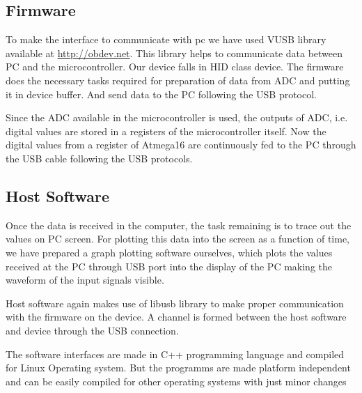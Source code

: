 \documentclass[12pt,a4paper]{article}
\begin{document}
\subsection{Firmware}
To make the interface to communicate with pc we have used VUSB library available at \url{http://obdev.net}. This library helps to communicate data between PC and the microcontroller. Our device falls in HID class device. The firmware does the necessary tasks required for preparation of data from ADC and putting it in device buffer. And send data to the PC following the USB protocol.

Since the ADC available in the microcontroller is used, the outputs of ADC, i.e. digital values are stored in a registers of the microcontroller itself. Now the digital values from a register of Atmega16 are continuously fed to the PC through the USB cable following the USB protocols. 

\subsection{Host Software}
Once the data is received in the computer, the task remaining is to trace out the values on PC screen. For plotting this data into the screen as a function of time, we have prepared a graph plotting software ourselves, which plots the values received at the PC through USB port into the display of the PC making the waveform of the input signals visible. 

Host software again makes use of libusb library to make proper communication with the firmware on the device. A channel is formed between the host software and device through the USB connection.


The software interfaces are made in C++ programming language and compiled for Linux Operating system. But the programms are made platform independent and can be easily compiled for other operating systems with just minor changes
\end{document}
